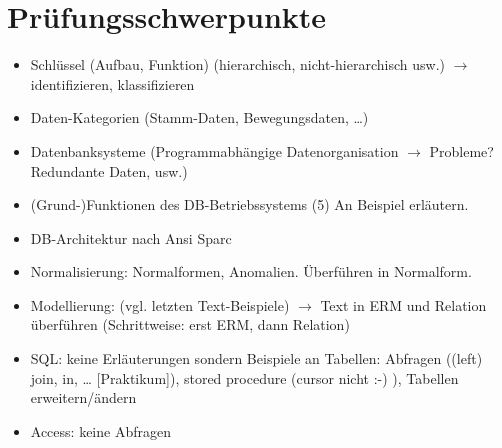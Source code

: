 \section*{Prüfungsschwerpunkte}
\begin{itemize}
\item Schlüssel (Aufbau, Funktion) (hierarchisch, nicht-hierarchisch usw.) $\to$ identifizieren, klassifizieren
\item Daten-Kategorien (Stamm-Daten, Bewegungsdaten, …)
\item Datenbanksysteme (Programmabhängige Datenorganisation $\to$ Probleme? Redundante Daten, usw.)
\item (Grund-)Funktionen des DB-Betriebssystems (5) An Beispiel erläutern.
\item DB-Architektur nach Ansi Sparc
\item Normalisierung: Normalformen, Anomalien. Überführen in Normalform.
\item Modellierung: (vgl. letzten Text-Beispiele) $\to$ Text in ERM und Relation überführen (Schrittweise: erst ERM, dann Relation)
\item SQL: keine Erläuterungen sondern Beispiele an Tabellen: Abfragen ((left) join, in, … [Praktikum]), stored procedure (cursor nicht :-) ), Tabellen erweitern/ändern
\item Access: keine Abfragen
\end{itemize}


